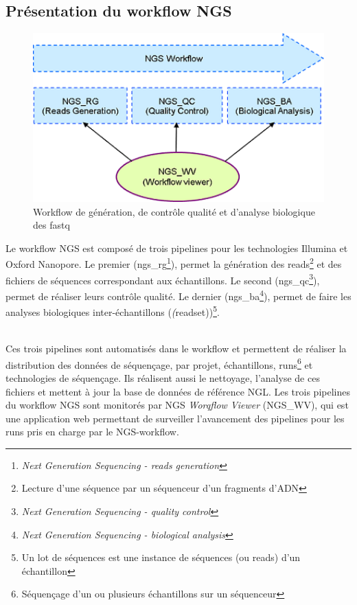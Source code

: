 \subsection{Présentation du workflow NGS}
\begin{minipage}{0.45\textwidth}
	\begin{figure}[H]
		\centering
		\includegraphics[width=1\textwidth]{img/Workflow.png}
		\caption{\footnotesize{Workflow de génération, de contrôle qualité et d’analyse biologique des fastq}}
		\label{worflow-genoscope}
	\end{figure}
\end{minipage} 
\hfill
\begin{minipage}{0.45\textwidth}
	Le workflow NGS est composé de trois pipelines pour les technologies Illumina et Oxford Nanopore. Le premier (ngs\_rg\footnote{\emph{Next Generation Sequencing - reads generation}}), permet la génération des reads\footnote{Lecture d'une séquence par un séquenceur d'un fragments d'ADN} et des fichiers de séquences correspondant aux échantillons. Le second (ngs\_qc\footnote{\emph{Next Generation Sequencing - quality control}}), permet de réaliser leurs contrôle qualité. Le dernier (ngs\_ba\footnote{\emph{Next Generation Sequencing - biological analysis}}), permet de faire les analyses biologiques inter-échantillons (\emph(readset))\footnote{Un lot de séquences est une instance de séquences (ou reads) d'un échantillon}. 
\end{minipage}\\[0.1cm]

Ces trois pipelines sont automatisés dans le workflow et permettent de réaliser la distribution des données de séquençage, par projet, échantillons, runs\footnote{Séquençage d'un ou plusieurs échantillons sur un séquenceur} et technologies de séquençage. Ils réalisent aussi le nettoyage, l'analyse de ces fichiers et mettent à jour la base de données de référence NGL. Les trois pipelines du workflow NGS sont monitorés par NGS \emph{Worqflow Viewer} (NGS\_WV), qui est une application web permettant de surveiller l'avancement des pipelines pour les runs pris en charge par le NGS-workflow.

